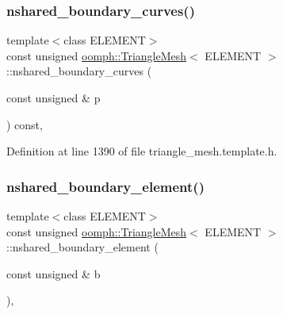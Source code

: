 \mbox{\label{classoomph_1_1TriangleMesh_a58c9106b7b1ca41244ee4c1c767a2ecc}} 
\subsubsection{\texorpdfstring{nshared\+\_\+boundary\+\_\+curves()}{nshared\_boundary\_curves()}}
{\footnotesize\ttfamily template$<$class E\+L\+E\+M\+E\+NT$>$ \\
const unsigned \hyperlink{classoomph_1_1TriangleMesh}{oomph\+::\+Triangle\+Mesh}$<$ E\+L\+E\+M\+E\+NT $>$\+::nshared\+\_\+boundary\+\_\+curves (\begin{DoxyParamCaption}\item[{const unsigned \&}]{p }\end{DoxyParamCaption}) const\hspace{0.3cm}{\ttfamily [inline]}, {\ttfamily [protected]}}



Definition at line 1390 of file triangle\+\_\+mesh.\+template.\+h.

\mbox{\label{classoomph_1_1TriangleMesh_a06b6f1ea869ecba4382c10149b306fc5}} 
\subsubsection{\texorpdfstring{nshared\+\_\+boundary\+\_\+element()}{nshared\_boundary\_element()}}
{\footnotesize\ttfamily template$<$class E\+L\+E\+M\+E\+NT$>$ \\
const unsigned \hyperlink{classoomph_1_1TriangleMesh}{oomph\+::\+Triangle\+Mesh}$<$ E\+L\+E\+M\+E\+NT $>$\+::nshared\+\_\+boundary\+\_\+element (\begin{DoxyParamCaption}\item[{const unsigned \&}]{b }\end{DoxyParamCaption})\hspace{0.3cm}{\ttfamily [inline]}, {\ttfamily [protected]}}



